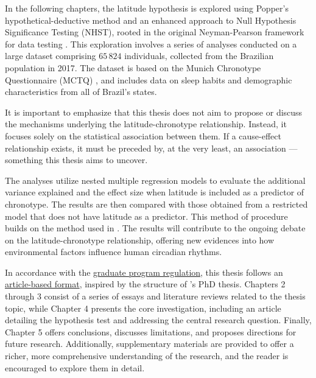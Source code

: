 \documentclass[
12pt,
openright,
oneside,
a4paper,
chapter=TITLE,
section=TITLE,
french,
spanish,
brazil,
english
]{abntex2}
\begin{document}
In the following chapters, the latitude hypothesis is explored using
Popper's hypothetical-deductive method \autocite{popper1979} and an
enhanced approach to Null Hypothesis Significance Testing (NHST), rooted
in the original Neyman-Pearson framework for data testing
\autocite{neyman1928,neyman1928a,perezgonzalez2015}. This exploration
involves a series of analyses conducted on a large dataset comprising
\(65\,824\) individuals, collected from the Brazilian population in
2017. The dataset is based on the Munich Chronotype Questionnaire (MCTQ)
\autocite{roenneberg2003,roenneberg2012a}, and includes data on sleep
habits and demographic characteristics from all of Brazil's states.

It is important to emphasize that this thesis does not aim to propose or
discuss the mechanisms underlying the latitude-chronotype relationship.
Instead, it focuses solely on the statistical association between them.
If a cause-effect relationship exists, it must be preceded by, at the
very least, an association --- something this thesis aims to uncover.

The analyses utilize nested multiple regression models to evaluate the
additional variance explained and the effect size when latitude is
included as a predictor of chronotype. The results are then compared
with those obtained from a restricted model that does not have latitude
as a predictor. This method of procedure builds on the method used in
\textcite{leocadio-miguel2017}. The results will contribute to the
ongoing debate on the latitude-chronotype relationship, offering new
evidences into how environmental factors influence human circadian
rhythms.

In accordance with the
\href{https://leginf.usp.br/?resolucao=resolucao-copgr-no-7829-de-03-de-outubro-de-2019\#:~:text=XI\%20\%E2\%80\%93\%20PROCEDIMENTOS\%20PARA\%20DEP\%C3\%93SITO\%20DA\%20DISSERTA\%C3\%87\%C3\%83O}{graduate
program regulation}, this thesis follows an
\href{https://en.wikipedia.org/wiki/Collection_of_articles}{article-based
format}, inspired by the structure of \textcite{reis2020}'s PhD thesis.
Chapters 2 through 3 consist of a series of essays and literature
reviews related to the thesis topic, while Chapter 4 presents the core
investigation, including an article detailing the hypothesis test and
addressing the central research question. Finally, Chapter 5 offers
conclusions, discusses limitations, and proposes directions for future
research. Additionally, supplementary materials are provided to offer a
richer, more comprehensive understanding of the research, and the reader
is encouraged to explore them in detail.
\end{document}
